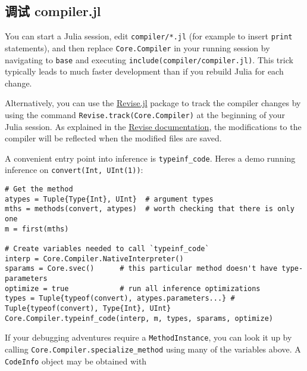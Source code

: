 \hypertarget{4685549306288927755}{}


\subsection{调试 compiler.jl}



You can start a Julia session, edit \texttt{compiler/*.jl} (for example to insert \texttt{print} statements), and then replace \texttt{Core.Compiler} in your running session by navigating to \texttt{base} and executing \texttt{include({\textquotedbl}compiler/compiler.jl{\textquotedbl})}. This trick typically leads to much faster development than if you rebuild Julia for each change.



Alternatively, you can use the \href{https://github.com/timholy/Revise.jl}{Revise.jl} package to track the compiler changes by using the command \texttt{Revise.track(Core.Compiler)} at the beginning of your Julia session. As explained in the \href{https://timholy.github.io/Revise.jl/stable/}{Revise documentation}, the modifications to the compiler will be reflected when the modified files are saved.



A convenient entry point into inference is \texttt{typeinf\_code}. Here{\textquotesingle}s a demo running inference on \texttt{convert(Int, UInt(1))}:




\begin{verbatim}
# Get the method
atypes = Tuple{Type{Int}, UInt}  # argument types
mths = methods(convert, atypes)  # worth checking that there is only one
m = first(mths)

# Create variables needed to call `typeinf_code`
interp = Core.Compiler.NativeInterpreter()
sparams = Core.svec()      # this particular method doesn't have type-parameters
optimize = true            # run all inference optimizations
types = Tuple{typeof(convert), atypes.parameters...} # Tuple{typeof(convert), Type{Int}, UInt}
Core.Compiler.typeinf_code(interp, m, types, sparams, optimize)
\end{verbatim}



If your debugging adventures require a \texttt{MethodInstance}, you can look it up by calling \texttt{Core.Compiler.specialize\_method} using many of the variables above. A \texttt{CodeInfo} object may be obtained with




